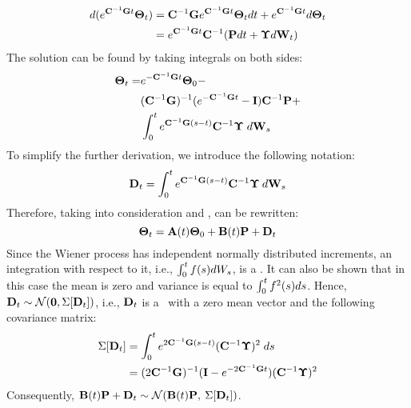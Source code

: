 \begin{align*}
  d(e^{\mathbf{C}^{-1} \mathbf{G} t} \mathbf{\Theta}_t) & = \mathbf{C}^{-1} \mathbf{G} e^{\mathbf{C}^{-1} \mathbf{G} t} \mathbf{\Theta}_t dt + e^{\mathbf{C}^{-1} \mathbf{G} t} d\mathbf{\Theta}_t \\
  & = e^{\mathbf{C}^{-1} \mathbf{G} t} \mathbf{C}^{-1} (\mathbf{P} dt + \mathbf{\Upsilon} d\mathbf{W}_t)
\end{align*}
The solution can be found by taking integrals on both sides:
\begin{align} \equlabel{solution-full}
  \vtemperature_\time = & \emcgt{} \vtemperature_0 - \\
    & (\cg)^{-1}(\emcgt{} - \mone) \mcapacitance^{-1} \vpower + \nonumber \\
    & \int_0^\time \ecg{}{(s - \time)} \mcapacitance^{-1} \mnoisedeviation \; d\m{W}_s \nonumber
\end{align}
To simplify the further derivation, we introduce the following notation:
\[
  \mathbf{D}_t = \int_0^{t} e^{ \mathbf{C}^{-1} \mathbf{G} (s - t)} \mathbf{C}^{-1} \mathbf{\Upsilon} \: d\mathbf{W}_s
\]
Therefore, taking into consideration  and ,  can be rewritten:
\[
  \mathbf{\Theta}_t = \mathbf{A}(t) \mathbf{\Theta}_0 + \mathbf{B}(t) \mathbf{P} + \mathbf{D}_t
\]
Since the Wiener process has independent normally distributed increments, an integration with respect to it, i.e., $\int_0^t f(s) dW_s$, is a \nrv. It can also be shown that in this case the mean is zero and variance is equal to $\int_0^t f^2(s) ds$. Hence, $\mathbf{D}_t \sim \mathcal{N}(\mathbf{0}, \Sigma[\mathbf{D}_t])$, i.e., $\mathbf{D}_t$ is a \mnrv\ with a zero mean vector and the following covariance matrix:
\begin{align}
  \covariance{\v{D}_\time} & = \int_0^\time \ecg{2}{(s - \time)} (\mcapacitance^{-1} \mnoisedeviation)^2 \; ds \nonumber \\
  & = (2 \cg)^{-1} (\mone - \emcgt{2}) (\mcapacitance^{-1} \mnoisedeviation)^2 \equlabel{covariance-d}
\end{align}
Consequently, $\mathbf{B}(t) \mathbf{P} + \mathbf{D}_t \sim \mathcal{N}(\mathbf{B}(t) \mathbf{P}, \: \Sigma[\mathbf{D}_t])$.
